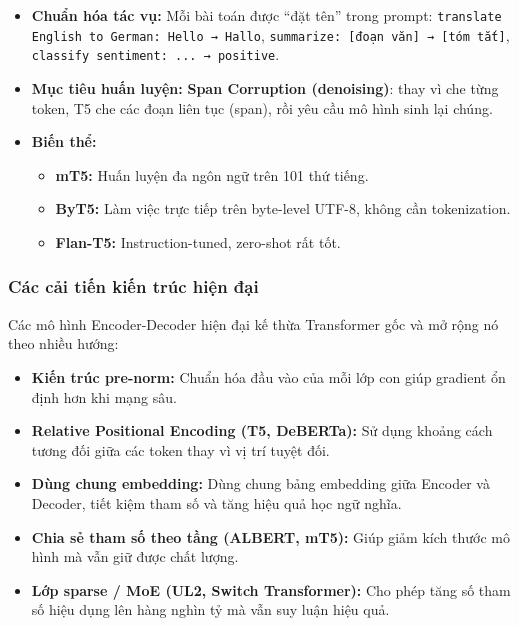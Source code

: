\begin{itemize}
	\item \textbf{Chuẩn hóa tác vụ:}  
	Mỗi bài toán được “đặt tên” trong prompt:  
	\texttt{translate English to German: Hello → Hallo},  
	\texttt{summarize: [đoạn văn] → [tóm tắt]},  
	\texttt{classify sentiment: ... → positive}.
	\item \textbf{Mục tiêu huấn luyện:} \textbf{Span Corruption (denoising)}:
	thay vì che từng token, T5 che các đoạn liên tục (span), rồi yêu cầu mô hình sinh lại chúng.
	\item \textbf{Biến thể:}
	\begin{itemize}
		\item \textbf{mT5:} Huấn luyện đa ngôn ngữ trên 101 thứ tiếng.
		\item \textbf{ByT5:} Làm việc trực tiếp trên byte-level UTF-8, không cần tokenization.
		\item \textbf{Flan-T5:} Instruction-tuned, zero-shot rất tốt.
	\end{itemize}
\end{itemize}

\begin{center}
	\label{fig:t5_text_to_text_framework}
\end{center}

\subsubsection{Các cải tiến kiến trúc hiện đại}
Các mô hình Encoder-Decoder hiện đại kế thừa Transformer gốc và mở rộng nó theo nhiều hướng:
\begin{itemize}
	\item \textbf{Kiến trúc pre-norm:} Chuẩn hóa đầu vào của mỗi lớp con giúp gradient ổn định hơn khi mạng sâu.
	\item \textbf{Relative Positional Encoding (T5, DeBERTa):}  
	Sử dụng khoảng cách tương đối giữa các token thay vì vị trí tuyệt đối.
	\item \textbf{Dùng chung embedding:}  
	Dùng chung bảng embedding giữa Encoder và Decoder, tiết kiệm tham số và tăng hiệu quả học ngữ nghĩa.
	\item \textbf{Chia sẻ tham số theo tầng (ALBERT, mT5):}  
	Giúp giảm kích thước mô hình mà vẫn giữ được chất lượng.
	\item \textbf{Lớp sparse / MoE (UL2, Switch Transformer):}  
	Cho phép tăng số tham số hiệu dụng lên hàng nghìn tỷ mà vẫn suy luận hiệu quả.
\end{itemize}

